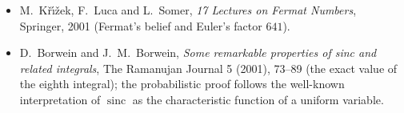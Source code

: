 \begin{itemize}
1079. N.~D.~Elkies, \emph{On $A^4+B^4+C^4=D^4$}, Mathematics of Computation 51 (1988), 825--835. R.~E.~Frye, \emph{Finding $95800^4+217519^4+414560^4=422481^4$ on the Connection Machine}, Proceedings of Supercomputing~88 (1988).
\item M.~K\v{r}\'{\i}\v{z}ek, F.~Luca and L.~Somer, \emph{17 Lectures on Fermat Numbers}, Springer, 2001 (Fermat's belief and Euler's factor $641$).
\item D.~Borwein and J.~M.~Borwein, \emph{Some remarkable properties of sinc and related integrals}, The Ramanujan Journal 5 (2001), 73--89 (the exact value of
the eighth integral); the probabilistic proof follows the well-known interpretation of $\operatorname{sinc}$ as the characteristic function of a uniform variable.
\end{itemize}
